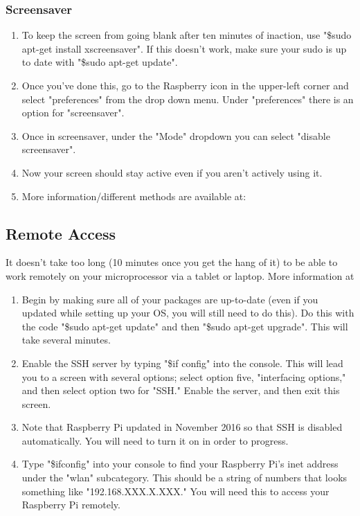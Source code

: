 \documentclass{article}\usepackage[]{graphicx}\usepackage[]{color}
\begin{document}
\subsubsection{Screensaver}

\begin{enumerate}

\item To keep the screen from going blank after ten minutes of inaction, use "\$sudo apt-get install xscreensaver".  If this doesn't work, make sure your sudo is up to date with "\$sudo apt-get update".  
\item Once you've done this, go to the Raspberry icon in the upper-left corner and select "preferences" from the drop down menu.  Under "preferences" there is an option for "screensaver".  
\item Once in screensaver, under the "Mode" dropdown you can select "disable screensaver".  
\item Now your screen should stay active even if you aren't actively using it.
\item More information/different methods are available at: %

\end{enumerate}

\subsection{Remote Access}

It doesn't take too long (10 minutes once you get the hang of it) to be able to work remotely on your microprocessor via a tablet or laptop.  More information at %

\begin{enumerate}

\item Begin by making sure all of your packages are up-to-date (even if you updated while setting up your OS, you will still need to do this).  Do this with the code "\$sudo apt-get update" and then "\$sudo apt-get upgrade".  This will take several minutes.
\item Enable the SSH server by typing "\$if config" into the console.  This will lead you to a screen with several options; select option five, "interfacing options," and then select option two for "SSH."  Enable the server, and then exit this screen.
\item Note that Raspberry Pi updated in November 2016 so that SSH is disabled automatically.  You will need to turn it on in order to progress.
\item Type "\$ifconfig" into your console to find your Raspberry Pi's inet address under the "wlan" subcategory.  This should be a string of numbers that looks something like "192.168.XXX.X.XXX."  You will need this to access your Raspberry Pi remotely.

\end{enumerate}
\end{document}
